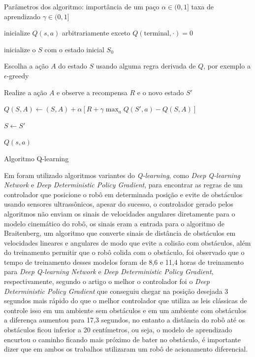 \begin{algorithm}[H]
    \label{Q-learning:}
    Parâmetros dos algoritmo: importância de um paço $\alpha \in (0,1]$
    taxa de aprendizado $\gamma \in (0,1] $

    
    
    inicialize $Q(s,a)$ arbitrariamente exceto $Q(\text{terminal},\cdot ) = 0$

     {
        inicialize o $S$ com o estado inicial $S_0$

        
         {
            Escolha a ação $A$ do estado $S$ usando alguma regra derivada de $Q$,
            por exemplo a $\epsilon$-greedy

            Realize a ação $A$ e observe a recompensa $R$ e o novo estado $S'$
            
            $Q(S,A) \leftarrow (S,A) + \alpha[R + \gamma \max_aQ(S',a) - Q(S,A)]$
            
            $S \leftarrow S'$


        }
        
    }
    \Retorna $Q(s,a)$
    \caption{Algoritmo Q-learning}
    
\end{algorithm}

Em \cite{quiroga2022position}
foram utilizado algoritmos variantes do \textit{Q-learning}, como \textit{Deep Q-learning Network} e \textit{Deep Deterministic Policy Gradient},
para encontrar as regras de um controlador que posicione o robô em determinada
posição e evite de obstáculos usando sensores ultrassônicos,
apesar do sucesso, o controlador gerado pelos algoritmos não enviam
os sinais de velocidades angulares diretamente para o modelo cinemático
do robô, os sinais eram a entrada para o algoritmo de Braitenberg, um
algoritmo que converte sinais de distância de obstáculos em velocidades
lineares e angulares de modo que evite a colisão com obstáculos, além do treinamento permitir que o robô
colida com o obstáculo, foi observado que o tempo de treinamento desses modelos
foram de 8,6 e 11,4 horas de treinamento para \textit{Deep Q-learning Network}
e \textit{Deep Deterministic Policy Gradient}, respectivamente, segundo o
artigo o melhor o controlador foi o \textit{Deep Deterministic Policy Gradient}
que conseguiu chegar na posição desejada 3 segundos mais rápido do que o
melhor controlador que utiliza as leis clássicas de controle isso em um ambiente sem
obstáculos e em um ambiente com obstáculos a diferença aumentou para
17,3 segundos, no entanto a distância do robô até os obstáculos ficou
inferior a 20 centímetros, ou seja, o modelo de aprendizado encurtou o
caminho ficando mais próximo de bater no obstáculo, é importante dizer que
em ambos os trabalhos utilizaram um robô de acionamento diferencial.

